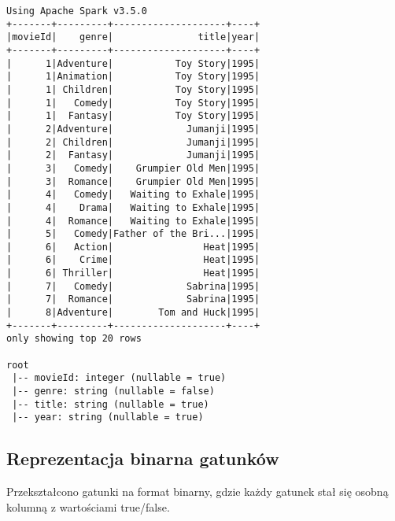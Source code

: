 \documentclass{article}
\begin{document}
\begin{verbatim}
Using Apache Spark v3.5.0
+-------+---------+--------------------+----+
|movieId|    genre|               title|year|
+-------+---------+--------------------+----+
|      1|Adventure|           Toy Story|1995|
|      1|Animation|           Toy Story|1995|
|      1| Children|           Toy Story|1995|
|      1|   Comedy|           Toy Story|1995|
|      1|  Fantasy|           Toy Story|1995|
|      2|Adventure|             Jumanji|1995|
|      2| Children|             Jumanji|1995|
|      2|  Fantasy|             Jumanji|1995|
|      3|   Comedy|    Grumpier Old Men|1995|
|      3|  Romance|    Grumpier Old Men|1995|
|      4|   Comedy|   Waiting to Exhale|1995|
|      4|    Drama|   Waiting to Exhale|1995|
|      4|  Romance|   Waiting to Exhale|1995|
|      5|   Comedy|Father of the Bri...|1995|
|      6|   Action|                Heat|1995|
|      6|    Crime|                Heat|1995|
|      6| Thriller|                Heat|1995|
|      7|   Comedy|             Sabrina|1995|
|      7|  Romance|             Sabrina|1995|
|      8|Adventure|        Tom and Huck|1995|
+-------+---------+--------------------+----+
only showing top 20 rows

root
 |-- movieId: integer (nullable = true)
 |-- genre: string (nullable = false)
 |-- title: string (nullable = true)
 |-- year: string (nullable = true)

\end{verbatim}

\subsection{Reprezentacja binarna gatunków}
Przekształcono gatunki na format binarny, gdzie każdy gatunek stał się osobną kolumną z wartościami true/false.
\end{document}
